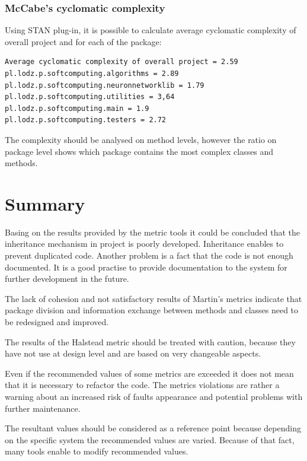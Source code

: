 \subsubsection*{McCabe's cyclomatic complexity}

Using STAN plug-in, it is possible to calculate average cyclomatic complexity of overall project and for each of the package:
\begin{verbatim}
Average cyclomatic complexity of overall project = 2.59
pl.lodz.p.softcomputing.algorithms = 2.89
pl.lodz.p.softcomputing.neuronnetworklib = 1.79 
pl.lodz.p.softcomputing.utilities = 3,64
pl.lodz.p.softcomputing.main = 1.9
pl.lodz.p.softcomputing.testers = 2.72
\end{verbatim}

The complexity should be analysed on method levels, however the ratio on package level shows which package contains the most complex classes and methods.

\section{Summary}

Basing on the results provided by the metric tools it could be concluded that the inheritance mechanism in project is poorly developed. Inheritance enables to prevent duplicated code. Another problem is a fact that the code is not enough documented. It is a good practise to provide documentation to the system for further development in the future. 

The lack of cohesion and not satisfactory results of Martin's metrics indicate that package division and information exchange between methods and classes need to be redesigned and improved. 

The results of the Halstead metric should be treated with caution, because they have not use at design level and are based on very changeable aspects.

Even if the recommended values of some metrics are exceeded it does not mean that it is necessary to refactor the code. The metrics violations are rather a warning about an increased risk of faults appearance and potential problems with further maintenance. 

The resultant values should be considered as a reference point because depending on the specific system the recommended values are varied. Because of that fact, many tools enable to modify  recommended values. 
